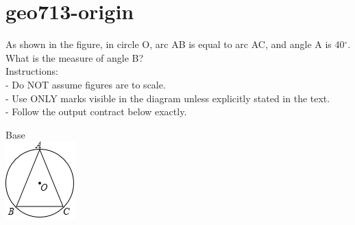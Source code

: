 \documentclass[12pt]{article}
\begin{document}
\section*{geo713-origin}
\noindent\begin{minipage}{\textwidth}
\setlength{\parskip}{4pt}
As shown in the figure, in circle O, arc AB is equal to arc AC, and angle A is 40\ensuremath{^\circ}. What is the measure of angle B?\\
Instructions:\\
- Do NOT assume figures are to scale.\\
- Use ONLY marks visible in the diagram unless explicitly stated in the text.\\
- Follow the output contract below exactly.\\
\end{minipage}
\begin{center}
\begin{minipage}{0.32\textwidth}\centering
Base\\
\includegraphics[width=0.95\linewidth]{out_rommath_origin/items/geo713-origin/assets/figure.png}
\end{minipage}
\par
\end{center}
\bigskip
\end{document}
